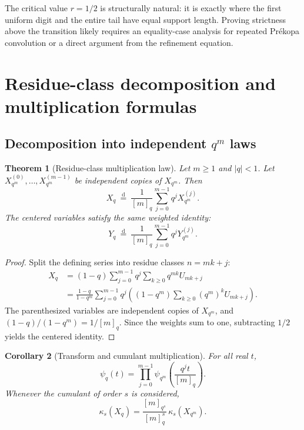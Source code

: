 \documentclass[11pt]{article}
\newtheorem{theorem}{Theorem}[section]
\newtheorem{corollary}[theorem]{Corollary}
\theoremstyle{definition}
\newcommand{\cump}{\kappa}
\newcommand{\doteqL}{\mathrel{\stackrel{\mathrm d}=}}
\begin{document}
The critical value \(r=1/2\) is structurally natural: it is exactly where the first
uniform digit and the entire tail have equal support length.  Proving strictness above
the transition likely requires an equality-case analysis for repeated Pr\'ekopa
convolution or a direct argument from the refinement equation.

\section{Residue-class decomposition and multiplication formulas}

\subsection{Decomposition into independent \texorpdfstring{$q^m$}{q^m} laws}

\begin{theorem}[Residue-class multiplication law]\label{thm:residue-decomposition}
Let \(m\ge1\) and \(\lvert q\rvert<1\).  Let
\(X_{q^m}^{(0)},\ldots,X_{q^m}^{(m-1)}\) be independent copies of \(X_{q^m}\).  Then
\begin{equation}
 \boxed{
 X_q\ \doteqL\ \frac1{[m]_q}\sum_{j=0}^{m-1}q^jX_{q^m}^{(j)}.} \label{eq:residue-decomposition}
\end{equation}
The centered variables satisfy the same weighted identity:
\begin{equation}
 Y_q\ \doteqL\ \frac1{[m]_q}\sum_{j=0}^{m-1}q^jY_{q^m}^{(j)}. \label{eq:centered-residue}
\end{equation}
\end{theorem}

\begin{proof}
Split the defining series into residue classes \(n=mk+j\):
\begin{align*}
 X_q
 &=(1-q)\sum_{j=0}^{m-1}q^j\sum_{k\ge0}q^{mk}U_{mk+j}\\
 &=\frac{1-q}{1-q^m}\sum_{j=0}^{m-1}q^j
 \left((1-q^m)\sum_{k\ge0}(q^m)^kU_{mk+j}\right).
\end{align*}
The parenthesized variables are independent copies of \(X_{q^m}\), and
\((1-q)/(1-q^m)=1/[m]_q\).  Since the weights sum to one, subtracting \(1/2\) yields the
centered identity.
\end{proof}

\begin{corollary}[Transform and cumulant multiplication]\label{cor:multiplication}
For all real \(t\),
\begin{equation}
 \boxed{
 \psi_q(t)=\prod_{j=0}^{m-1}
 \psi_{q^m}\!\left(\frac{q^jt}{[m]_q}\right).}            \label{eq:psi-multiplication}
\end{equation}
Whenever the cumulant of order \(s\) is considered,
\begin{equation}
 \boxed{
 \cump_s(X_q)=\frac{[m]_{q^s}}{[m]_q^s}\,
 \cump_s(X_{q^m}).}                                      \label{eq:cumulant-multiplication}
\end{equation}
\end{corollary}
\end{document}
